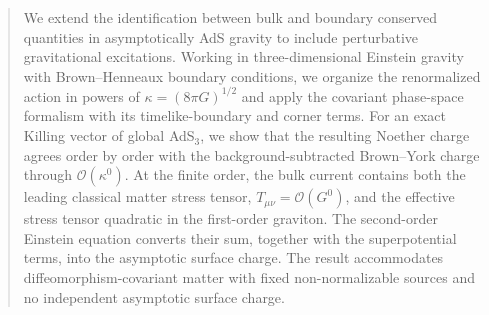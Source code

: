 \begin{abstract}

We extend the identification between bulk and boundary conserved quantities in asymptotically AdS gravity to include perturbative gravitational excitations. Working in three-dimensional Einstein gravity with Brown--Henneaux boundary conditions, we organize the renormalized action in powers of $\kappa=(8\pi G)^{1/2}$ and apply the covariant phase-space formalism with its timelike-boundary and corner terms. For an exact Killing vector of global AdS$_3$, we show that the resulting Noether charge agrees order by order with the background-subtracted Brown--York charge through $\mathcal{O}(\kappa^0)$. At the finite order, the bulk current contains both the leading classical matter stress tensor, $T_{\mu\nu}=\mathcal{O}(G^0)$, and the effective stress tensor quadratic in the first-order graviton. The second-order Einstein equation converts their sum, together with the superpotential terms, into the asymptotic surface charge. The result accommodates diffeomorphism-covariant matter with fixed non-normalizable sources and no independent asymptotic surface charge.

\end{abstract}

\newpage
